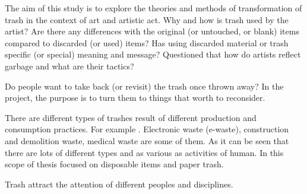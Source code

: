 The aim of this study is to explore the theories and methods of transformation of trash in the context of art and artistic act. %
Why and how is trash used by the artist? Are there any differences with the original (or untouched, or blank) items compared to discarded (or used) items? Has using discarded material or trash specific (or special) meaning and message? Questioned that how do artists reflect garbage and what are their tactics?



Do people want to take back (or revisit) the trash once thrown away? In the project, the purpose is to turn them to things that worth to reconsider. 





%
%
There are different types of trashes result of different production and consumption practices. For example . Electronic waste (e-waste), construction and demolition waste, medical waste are some of them. As it can be seen that there are lots of different types and as various as activities of human. In this scope of thesis focused on disposable items and paper trash.





%
%
Trash attract the attention of different peoples and disciplines.


